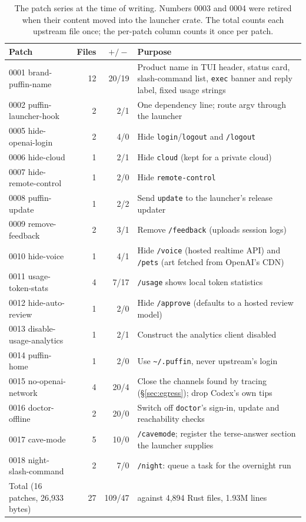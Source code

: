 \documentclass[11pt]{article}
\newcommand{\code}[1]{\texttt{#1}}
\begin{document}
\begin{table}[t]
\centering
\small
\begin{tabularx}{\linewidth}{@{}l r r X@{}}
\toprule
Patch & Files & $+/-$ & Purpose \\
\midrule
0001 brand-puffin-name & 12 & 20/19 & Product name in TUI header, status card, slash-command list, \code{exec} banner and reply label, fixed usage strings \\
0002 puffin-launcher-hook & 2 & 2/1 & One dependency line; route argv through the launcher \\
0005 hide-openai-login & 2 & 4/0 & Hide \code{login}/\code{logout} and \code{/logout} \\
0006 hide-cloud & 1 & 2/1 & Hide \code{cloud} (kept for a private cloud) \\
0007 hide-remote-control & 1 & 2/0 & Hide \code{remote-control} \\
0008 puffin-update & 1 & 2/2 & Send \code{update} to the launcher's release updater \\
0009 remove-feedback & 2 & 3/1 & Remove \code{/feedback} (uploads session logs) \\
0010 hide-voice & 1 & 4/1 & Hide \code{/voice} (hosted realtime API) and \code{/pets} (art fetched from OpenAI's CDN) \\
0011 usage-token-stats & 4 & 7/17 & \code{/usage} shows local token statistics \\
0012 hide-auto-review & 1 & 2/0 & Hide \code{/approve} (defaults to a hosted review model) \\
0013 disable-usage-analytics & 1 & 2/1 & Construct the analytics client disabled \\
0014 puffin-home & 1 & 2/0 & Use \code{\textasciitilde/.puffin}, never upstream's login \\
0015 no-openai-network & 4 & 20/4 & Close the channels found by tracing (\S\ref{sec:egress}); drop Codex's own tips \\
0016 doctor-offline & 2 & 20/0 & Switch off \code{doctor}'s sign-in, update and reachability checks \\
0017 cave-mode & 5 & 10/0 & \code{/cavemode}; register the terse-answer section the launcher supplies \\
0018 night-slash-command & 2 & 7/0 & \code{/night}: queue a task for the overnight run \\
\midrule
Total (16 patches, 26{,}933 bytes) & 27 & 109/47 & against 4{,}894 Rust files, 1.93M lines \\
\bottomrule
\end{tabularx}
\caption{The patch series at the time of writing. Numbers 0003 and 0004 were retired when their
content moved into the launcher crate. The total counts each upstream file once; the per-patch
column counts it once per patch.}
\label{tab:patches}
\end{table}
\end{document}
